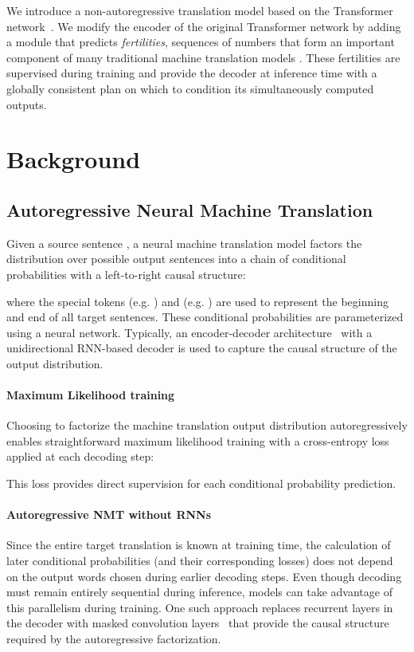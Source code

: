 \documentclass{article} \usepackage{iclr2018_conference,times}
\begin{document}
We introduce a non-autoregressive translation model based on the Transformer network~\citep{vaswani2017attention}. We modify the encoder of the original Transformer network by adding a module that predicts \emph{fertilities}, sequences of numbers that form an important component of many traditional machine translation models \citep{brown1993mathematics}.
These fertilities are supervised during training and provide the decoder at inference time with a globally consistent plan on which to condition its simultaneously computed outputs.

\section{Background}
\subsection{Autoregressive Neural Machine Translation}
Given a source sentence , a neural machine translation model factors the distribution over possible output sentences  into a chain of conditional probabilities with a left-to-right causal structure:

where the special tokens  (e.g. ) and  (e.g. ) are used to represent the beginning and end of all target sentences.
These conditional probabilities are parameterized using a neural network. Typically, an encoder-decoder architecture~\citep{sutskever2014sequence} with a unidirectional RNN-based decoder is used to capture the causal structure of the output distribution.

\vspace{-5pt}
\paragraph{Maximum Likelihood training}
Choosing to factorize the machine translation output distribution autoregressively enables straightforward maximum likelihood training with a cross-entropy loss applied at each decoding step:

This loss provides direct supervision for each conditional probability prediction.

\vspace{-5pt}
\paragraph{Autoregressive NMT without RNNs}
Since the entire target translation is known at training time, the calculation of later conditional probabilities (and their corresponding losses) does not depend on the output words chosen during earlier decoding steps. Even though decoding must remain entirely sequential during inference, models can take advantage of this parallelism during training.
One such approach replaces recurrent layers in the decoder with masked convolution layers~\citep{kalchbrenner2016neural, gehring2017convolutional} that provide the causal structure required by the autoregressive factorization.
\end{document}
